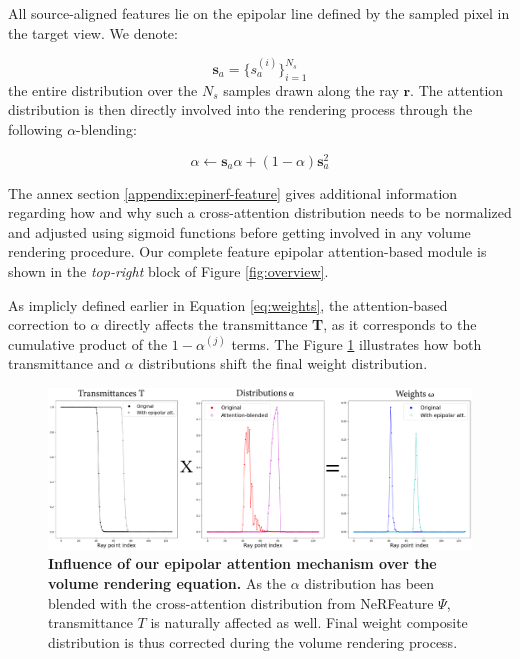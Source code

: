 All source-aligned features lie on the epipolar line defined by the sampled pixel in the target view. We denote:

\begin{equation}
  \mathbf{s}_{a} = \{ s_{a}^{(i)}\}_{i=1}^{N_{s}}
\end{equation}
 the entire distribution over the $N_s$ samples drawn along the ray $\mathbf{r}$. The attention distribution is then directly involved into the rendering process through the following $\alpha$-blending: 

\begin{equation}
\label{eq:alpha}
\alpha  \gets \textbf{s}_{a}\alpha + (1-\alpha)\textbf{s}_{a}^{2}
\end{equation}

The annex section \ref{appendix:epinerf-feature} gives additional information regarding how and why such a cross-attention distribution needs to be normalized and adjusted using sigmoid functions before getting involved in any volume rendering procedure. Our complete feature epipolar attention-based module is shown in the \textit{top-right} block of Figure \ref{fig:overview}. 

As implicly defined earlier in Equation \eqref{eq:weights}, the attention-based correction to $\alpha$ directly affects the transmittance \textbf{T}, as it corresponds to the cumulative product of the $1 - \alpha^{(j)}$ terms. The Figure \ref{fig:overall_attention} illustrates how both transmittance and $\alpha$ distributions shift the final weight distribution. 

\begin{figure}[h!]
    \begin{center}
  \includegraphics[width=\linewidth]{images/epinerf/SUPP_VR_OVERLEAF.png}
  \caption{\textbf{Influence of our epipolar attention mechanism over the volume rendering equation.} As the $\alpha$ distribution has been blended with the cross-attention distribution from NeRFeature $\Psi$, transmittance $T$ is naturally affected as well. Final weight composite distribution is thus corrected during the volume rendering process.} 
  \label{fig:overall_attention}
  \end{center}
\end{figure}

